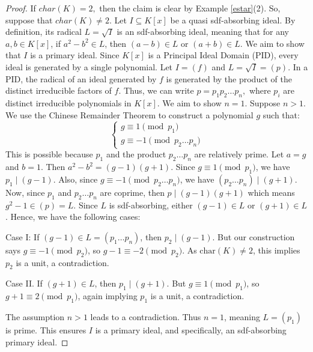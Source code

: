 \documentclass[10pt,a4paper]{amsart}
\begin{document}
\begin{proof}
If $char(K)=2,$ then the claim is clear by Example \ref{estar}(2). So, suppose
that $char(K)\neq2$. Let $I\subseteq K[x]$ be a quasi sdf-absorbing ideal. By
definition, its radical $L=\sqrt{I}$ is an sdf-absorbing ideal, meaning that
for any $a,b\in K[x]$, if $a^{2}-b^{2}\in L$, then $(a-b)\in L$ or $(a+b)\in
L$. We aim to show that $I$ is a primary ideal. \newline Since $K[x]$ is a
Principal Ideal Domain (PID), every ideal is generated by a single polynomial.
Let $I=(f)$ and $L=\sqrt{I}=(p)$. In a PID, the radical of an ideal generated
by $f$ is generated by the product of the distinct irreducible factors of $f$.
Thus, we can write $p=p_{1}p_{2}\dots p_{n},$ where $p_{i}$ are distinct
irreducible polynomials in $K[x]$. We aim to show $n=1$. Suppose $n>1$. We use
the Chinese Remainder Theorem to construct a polynomial $g$ such that:%
\[%
\begin{cases}
g\equiv1\pmod{p_1}\\
g\equiv-1\pmod{p_2 \dots p_n}
\end{cases}
\]
This is possible because $p_{1}$ and the product $p_{2}\dots p_{n}$ are
relatively prime. Let $a=g$ and $b=1$. Then $a^{2}-b^{2}=(g-1)(g+1)$. Since
$g\equiv1\pmod{p_1}$, we have $p_{1}\mid(g-1)$. Also, since $g\equiv
-1\pmod{p_2 \dots p_n}$, we have $(p_{2}\dots p_{n})\mid(g+1)$. Now, since
$p_{1}$ and $p_{2}\dots p_{n}$ are coprime, then $p\mid(g-1)(g+1)$ which means
$g^{2}-1\in(p)=L.$ Since $L$ is sdf-absorbing, either $(g-1)\in L$ or
$(g+1)\in L$. Hence, we have the following cases:

Case I: If $(g-1)\in L=(p_{1}\dots p_{n})$, then $p_{2}\mid(g-1)$. But our
construction says $g\equiv-1\pmod{p_2}$, so $g-1\equiv-2\pmod{p_2}$. As
$\text{char}(K)\neq2$, this implies $p_{2}$ is a unit, a contradiction.

Case II. If $(g+1)\in L$, then $p_{1}\mid(g+1)$. But $g\equiv1\pmod{p_1}$, so
$g+1\equiv2\pmod{p_1}$, again implying $p_{1}$ is a unit, a contradiction.

The assumption $n>1$ leads to a contradiction. Thus $n=1$, meaning $L=(p_{1})$
is prime. This ensures $I$ is a primary ideal, and specifically, an
sdf-absorbing primary ideal.
\end{proof}
\end{document}
